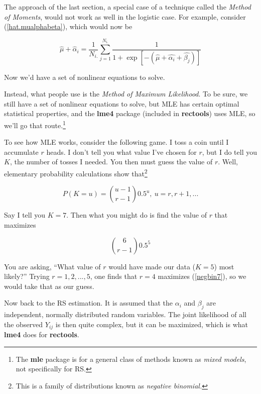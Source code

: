 The approach of the last section, a special case of a technique called
the \textit{Method of Moments}, would not work as well in the logistic
case.  For example, consider (\ref{hat.mualphabeta}), which would now be

\begin{equation}
\label{nonlin1}
\widehat{\mu} + \widehat{\alpha}_i = 
\frac{1}{N_{i.}} \sum_{j=1}^{N_{i.}}
\frac{1}{1 + \exp[-(\widehat{\mu} + \widehat{\alpha_i} + \widehat{\beta_j})]}
\end{equation}

Now we'd have a set of nonlinear equations to solve.

Instead, what people use is the \textit{Method of Maximum Likelihood}.
To be sure, we still have a set of nonlinear equations to solve, but MLE
has certain optimal statistical properties, and the \textbf{lme4}
package (included in \textbf{rectools}) uses MLE, so we'll go that
route.\footnote{The \textbf{mle} package is for a general class of
methods known as \textit{mixed models}, not specifically for RS.}

To see how MLE works, consider the following game.  I toss a coin until
I accumulate $r$ heads.  I don't tell you what value I've chosen for
$r$, but I do tell you $K$, the number of tosses I needed.  You then
must guess the value of $r$.  Well, elementary probability calculations 
show that\footnote{This is a family of distributions known as
\textit{negative binomial.}}

\begin{equation}
\label{negbin}
P(K = u) = \binom{u-1}{r-1} 0.5^u,~ u = r, r+1, ...
\end{equation}

Say I tell you $K = 7$.  Then what you might do is find the value of $r$
that maximizes 

\begin{equation}
\label{negbin7}
\binom{6}{r-1} 0.5^5
\end{equation}

You are asking, ``What value of $r$ would have made our data ($K = 5$)
most likely?''  Trying $r = 1,2,...,5$, one finds that $r = 4$ maximizes
(\ref{negbin7}), so we would take that as our guess.

Now back to the RS estimation.  It is assumed that the $\alpha_i$ and
$\beta_j$ are independent, normally distributed random variables.
The joint likelihood of all the observed $Y_{ij}$ is then quite complex,
but it can be maximized, which is what \textbf{lme4} does for
\textbf{rectools}.  


